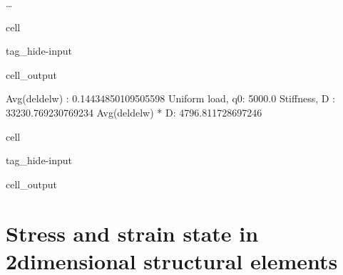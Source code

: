 \documentclass[letterpaper,10pt,english]{jupyterBook}
\begin{document}
\sphinxAtStartPar
…

\begin{sphinxuseclass}{cell}
\begin{sphinxuseclass}{tag_hide-input}\begin{sphinxVerbatimOutput}

\begin{sphinxuseclass}{cell_output}
\noindent{}

\begin{sphinxVerbatim}[commandchars=\\\{\}]
Avg(del\PYGZus{}del\PYGZus{}w)  : 0.14434850109505598
Uniform load, q0: 5000.0
Stiffness, D    : 33230.769230769234
Avg(del\PYGZus{}del\PYGZus{}w) * D:  4796.811728697246
\end{sphinxVerbatim}

\end{sphinxuseclass}\end{sphinxVerbatimOutput}

\end{sphinxuseclass}
\end{sphinxuseclass}
\begin{sphinxuseclass}{cell}
\begin{sphinxuseclass}{tag_hide-input}\begin{sphinxVerbatimOutput}

\begin{sphinxuseclass}{cell_output}
\noindent{}

\end{sphinxuseclass}\end{sphinxVerbatimOutput}

\end{sphinxuseclass}
\end{sphinxuseclass}
\sphinxstepscope


\section{Stress and strain state in 2\sphinxhyphen{}dimensional structural elements}
\label{\detokenize{ch/solids/plates-shells/stress-strain-state:stress-and-strain-state-in-2-dimensional-structural-elements}}\label{\detokenize{ch/solids/plates-shells/stress-strain-state:solid-mechanics-small-displacements-plates-shells-stress-strain-state}}\label{\detokenize{ch/solids/plates-shells/stress-strain-state::doc}}
\end{document}
